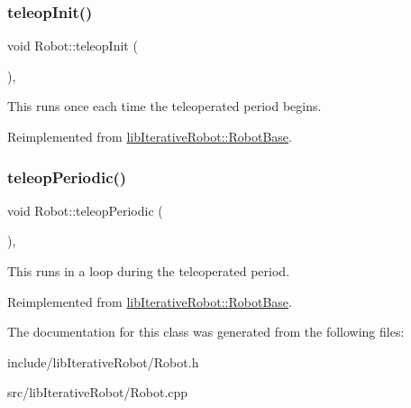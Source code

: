\subsubsection{\texorpdfstring{teleopInit()}{teleopInit()}}
{\footnotesize\ttfamily void Robot\+::teleop\+Init (\begin{DoxyParamCaption}{ }\end{DoxyParamCaption})\hspace{0.3cm}{\ttfamily [protected]}, {\ttfamily [virtual]}}

This runs once each time the teleoperated period begins. 

Reimplemented from \mbox{\hyperlink{classlib_iterative_robot_1_1_robot_base_a290bea17acf9bc884a490472e9d2e039}{lib\+Iterative\+Robot\+::\+Robot\+Base}}.

\mbox{\label{class_robot_a78f62f5d6eb05e27bfa1998fc35a519c}} 
\subsubsection{\texorpdfstring{teleopPeriodic()}{teleopPeriodic()}}
{\footnotesize\ttfamily void Robot\+::teleop\+Periodic (\begin{DoxyParamCaption}{ }\end{DoxyParamCaption})\hspace{0.3cm}{\ttfamily [protected]}, {\ttfamily [virtual]}}

This runs in a loop during the teleoperated period. 

Reimplemented from \mbox{\hyperlink{classlib_iterative_robot_1_1_robot_base_a564ee86d582b598dd0713c067b352aef}{lib\+Iterative\+Robot\+::\+Robot\+Base}}.



The documentation for this class was generated from the following files\+:\begin{DoxyCompactItemize}
\item 
include/lib\+Iterative\+Robot/Robot.\+h\item 
src/lib\+Iterative\+Robot/Robot.\+cpp\end{DoxyCompactItemize}
